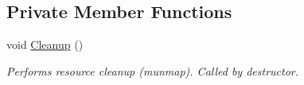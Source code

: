 \subsection*{Private Member Functions}
\begin{DoxyCompactItemize}
\item 
\mbox{\label{classEventDetect_1_1SharedMemoryTimestampExporter_a5710546acb54eeb6814e9c4e0a03de52}} 
void \mbox{\hyperlink{classEventDetect_1_1SharedMemoryTimestampExporter_a5710546acb54eeb6814e9c4e0a03de52}{Cleanup}} ()
\begin{DoxyCompactList}\small\item\em Performs resource cleanup (munmap). Called by destructor. \end{DoxyCompactList}\end{DoxyCompactItemize}
